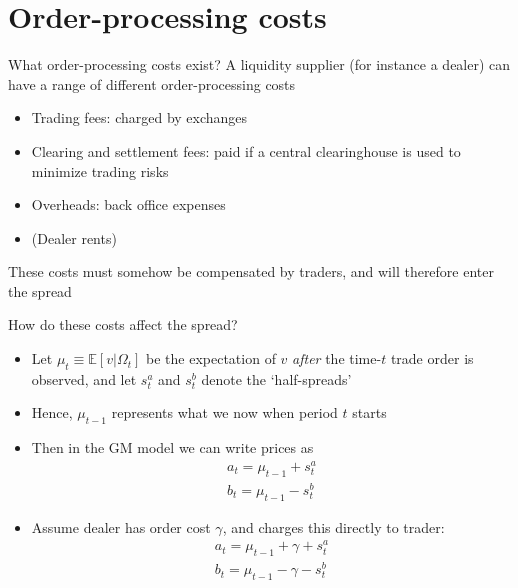 \documentclass[english,10pt
,aspectratio=169
]{beamer}
\begin{document}
\section{Order-processing costs}

\begin{frame}{What order-processing costs exist?}
	A liquidity supplier (for instance a dealer) can have a range of different order-processing costs
	\begin{itemize}
		\item Trading fees:  charged by exchanges
		\item Clearing and settlement fees:  paid if a central clearinghouse is used to minimize trading risks
		\item Overheads: back office expenses
		\item (Dealer rents)
	\end{itemize}
	These costs must somehow be compensated by traders, and will therefore enter the spread
\end{frame}


\begin{frame}{How do these costs affect the spread?}
	\begin{itemize}
		\item Let $\mu_t \equiv \mathbb{E}[v | \Omega_t]$ be the expectation of $v$ \textit{after} the time-$t$ trade order is observed, and let $s^a_t$ and $s^b_t$ denote the `half-spreads'
		\item Hence, $\mu_{t-1}$ represents what we now when period $t$ starts
		\item  Then in the GM model  we can write prices as
		\begin{align*}
		a_{t} = \mu_{t-1} +s^{a}_{t} \\
		b_{t} = \mu_{t-1} - s^{b}_{t}
		\end{align*}
		\item Assume dealer has order cost $\gamma$, and charges this directly to trader:
		\begin{align*}
		a_{t} = \mu_{t-1} + \gamma + s^{a}_{t} \\
		b_{t} = \mu_{t-1} - \gamma - s^{b}_{t}
		\end{align*}
	\end{itemize}
\end{frame}
\end{document}
